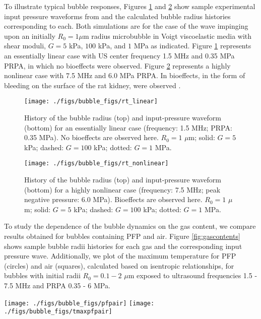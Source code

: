 To illustrate typical bubble responses, Figures
\ref{fig:sample_bubble_linear} and \ref{fig:sample_bubble_nonlinear}
show sample experimental input pressure waveforms from
\citep{Miller2008b} and the calculated bubble radius histories
corresponding to each. Both simulations are for the case of the wave
impinging upon an initially $R_0=1 \mu$m radius microbubble in Voigt
viscoelastic media with shear moduli, $G=5$ kPa, $100$ kPa, and $1$
MPa as indicated. Figure \ref{fig:sample_bubble_linear} represents an
essentially linear case with \ac{US} center frequency 1.5 MHz and 0.35
MPa \ac{PRPA}, in which no bioeffects were observed. Figure
\ref{fig:sample_bubble_nonlinear} represents a highly nonlinear case
with 7.5 MHz and 6.0 MPa \ac{PRPA}. In bioeffects, in the form of
bleeding on the surface of the rat kidney, were observed
\cite{Miller2008b}.
\begin{figure}%
  \centering
  \texttt{[image: ./figs/bubble\_figs/rt\_linear]}
  \caption[Bubble radius history and input-pressure for an essentially linear case]{History of the bubble radius (top) and input-pressure
    waveform (bottom) for an essentially linear case (frequency: 1.5 MHz; \ac{PRPA}: 0.35 MPa). No bioeffects are observed
    here. $R_0=1$ $\mu$m; solid: $G=5$ kPa; dashed: $G=100$ kPa; dotted: $G=1$ MPa.}
  \label{fig:sample_bubble_linear}
\end{figure}
%
\begin{figure}%
  \centering \texttt{[image: ./figs/bubble\_figs/rt\_nonlinear]}
  \caption[Bubble radius history and input-pressure for a nonlinear case]{History of the bubble radius (top) and input-pressure
    waveform (bottom) for a highly nonlinear case (frequency: 
    7.5 MHz; peak negative pressure: 6.0 MPa). Bioeffects are observed
    here. $R_0=1$ $\mu$m; solid: $G=5$ kPa; dashed: $G=100$ kPa; dotted: $G=1$ MPa.}
  \label{fig:sample_bubble_nonlinear}
\end{figure}

To study the dependence of the bubble dynamics on the gas content, we
compare results obtained for bubbles containing \ac{PFP} and air.
Figure \ref{fig:gascontents} shows sample bubble radii histories for
each gas and the corresponding input pressure wave. Additionally, we
plot of the maximum temperature for \ac{PFP} (circles) and air
(squares), calculated based on isentropic relationships, for bubbles
with initial radii $R_0=0.1-2$ $\mu$m exposed to ultrasound
frequencies 1.5 - 7.5 MHz and \ac{PRPA} 0.35 - 6 MPa.
\begin{figure*}%
  \texttt{[image: ./figs/bubble\_figs/pfpair]}%
  \texttt{[image: ./figs/bubble\_figs/tmaxpfpair]}%
  \caption[Dependence of the bubble dynamics on the gas contents]{ Dependence of the bubble dynamics on the gas contents ($G=100$ kPa). (Left) History of the bubble radius for \ac{PFP} (solid) 
    and air (dashed). (Right) Maximum temperature for \ac{PFP} (circles) and air (squares). $R_0=0.1-2$ $\mu$m; frequency: 1.5 - 7.5 MHz. }
  \label{fig:gascontents}
\end{figure*}

